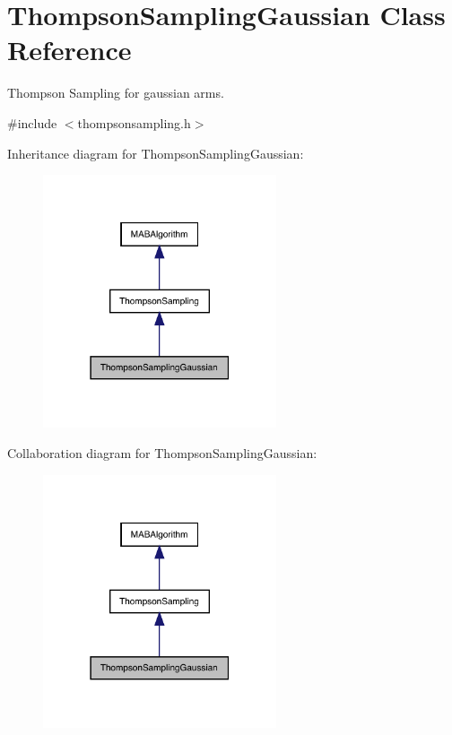 \hypertarget{class_thompson_sampling_gaussian}{}\section{Thompson\+Sampling\+Gaussian Class Reference}
\label{class_thompson_sampling_gaussian}


Thompson Sampling for gaussian arms.  




{\ttfamily \#include $<$thompsonsampling.\+h$>$}



Inheritance diagram for Thompson\+Sampling\+Gaussian\+:
\nopagebreak
\begin{figure}[H]
\begin{center}
\leavevmode
\includegraphics[width=195pt]{class_thompson_sampling_gaussian__inherit__graph}
\end{center}
\end{figure}


Collaboration diagram for Thompson\+Sampling\+Gaussian\+:
\nopagebreak
\begin{figure}[H]
\begin{center}
\leavevmode
\includegraphics[width=195pt]{class_thompson_sampling_gaussian__coll__graph}
\end{center}
\end{figure}
